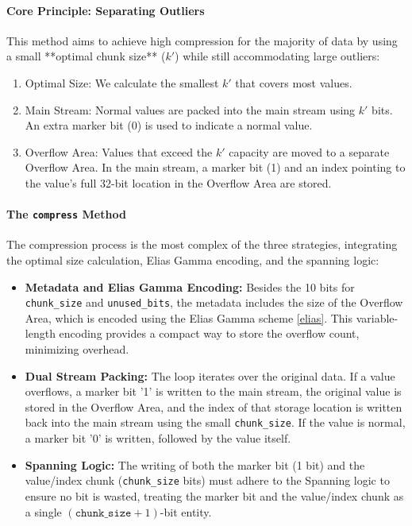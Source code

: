 \documentclass[11pt, a4paper]{article}
\begin{document}
	\paragraph{Core Principle: Separating Outliers}
	This method aims to achieve high compression for the majority of data by using a small **optimal chunk size** ($k'$) while still accommodating large outliers:
	\begin{enumerate}
		\item Optimal Size: We calculate the smallest $k'$ that covers most values.
		\item Main Stream: Normal values are packed into the main stream using $k'$ bits. An extra marker bit (0) is used to indicate a normal value.
		\item Overflow Area: Values that exceed the $k'$ capacity are moved to a separate Overflow Area. In the main stream, a marker bit (1) and an index pointing to the value's full 32-bit location in the Overflow Area are stored.
	\end{enumerate}
	
\paragraph{The \texttt{compress} Method}
The compression process is the most complex of the three strategies, integrating the optimal size calculation, Elias Gamma encoding, and the spanning logic:

\begin{itemize}
	\item \textbf{Metadata and Elias Gamma Encoding:} Besides the 10 bits for \texttt{chunk\_size} and \texttt{unused\_bits}, the metadata includes the size of the Overflow Area, which is encoded using the Elias Gamma scheme \ref{elias}. This variable-length encoding provides a compact way to store the overflow count, minimizing overhead.
	\item \textbf{Dual Stream Packing:} The loop iterates over the original data. If a value overflows, a marker bit '1' is written to the main stream, the original value is stored in the Overflow Area, and the index of that storage location is written back into the main stream using the small \texttt{chunk\_size}. If the value is normal, a marker bit '0' is written, followed by the value itself.
	\item \textbf{Spanning Logic:} The writing of both the marker bit (1 bit) and the value/index chunk (\texttt{chunk\_size} bits) must adhere to the Spanning logic to ensure no bit is wasted, treating the marker bit and the value/index chunk as a single $ (\texttt{chunk\_size} + 1) $-bit entity.
\end{itemize}
\end{document}
